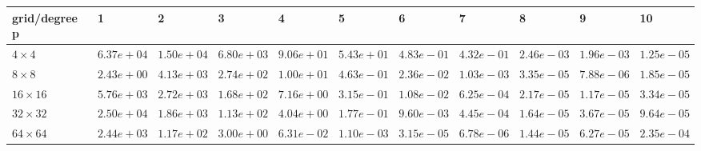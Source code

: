 \begin{tabular}{lllllllllll}
\hline
 grid/degree p   & 1          & 2          & 3          & 4          & 5          & 6          & 7          & 8          & 9          & 10         \\
\hline
 $4 \times 4$    & $6.37e+04$ & $1.50e+04$ & $6.80e+03$ & $9.06e+01$ & $5.43e+01$ & $4.83e-01$ & $4.32e-01$ & $2.46e-03$ & $1.96e-03$ & $1.25e-05$ \\
 $8 \times 8$    & $2.43e+00$ & $4.13e+03$ & $2.74e+02$ & $1.00e+01$ & $4.63e-01$ & $2.36e-02$ & $1.03e-03$ & $3.35e-05$ & $7.88e-06$ & $1.85e-05$ \\
 $16 \times 16$  & $5.76e+03$ & $2.72e+03$ & $1.68e+02$ & $7.16e+00$ & $3.15e-01$ & $1.08e-02$ & $6.25e-04$ & $2.17e-05$ & $1.17e-05$ & $3.34e-05$ \\
 $32 \times 32$  & $2.50e+04$ & $1.86e+03$ & $1.13e+02$ & $4.04e+00$ & $1.77e-01$ & $9.60e-03$ & $4.45e-04$ & $1.64e-05$ & $3.67e-05$ & $9.64e-05$ \\
 $64 \times 64$  & $2.44e+03$ & $1.17e+02$ & $3.00e+00$ & $6.31e-02$ & $1.10e-03$ & $3.15e-05$ & $6.78e-06$ & $1.44e-05$ & $6.27e-05$ & $2.35e-04$ \\
\hline
\end{tabular}